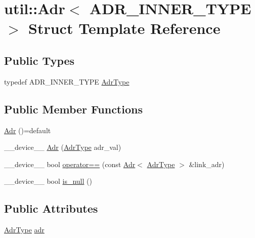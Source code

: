 \hypertarget{structutil_1_1Adr}{\section{util\-:\-:Adr$<$ A\-D\-R\-\_\-\-I\-N\-N\-E\-R\-\_\-\-T\-Y\-P\-E $>$ Struct Template Reference}
\label{structutil_1_1Adr}
}
\subsection*{Public Types}
\begin{DoxyCompactItemize}
\item 
typedef A\-D\-R\-\_\-\-I\-N\-N\-E\-R\-\_\-\-T\-Y\-P\-E \hyperlink{structutil_1_1Adr_a9e5161dc90263db4a33e195e310ccc45}{Adr\-Type}
\end{DoxyCompactItemize}
\subsection*{Public Member Functions}
\begin{DoxyCompactItemize}
\item 
\hyperlink{structutil_1_1Adr_a8b9054caa9404e1fcd00d06e0965aa49}{Adr} ()=default
\item 
\-\_\-\-\_\-device\-\_\-\-\_\- \hyperlink{structutil_1_1Adr_a788aac901f1054d2cd039c46596f2385}{Adr} (\hyperlink{structutil_1_1Adr_a9e5161dc90263db4a33e195e310ccc45}{Adr\-Type} adr\-\_\-val)
\item 
\-\_\-\-\_\-device\-\_\-\-\_\- bool \hyperlink{structutil_1_1Adr_aaffa3d3d87a91419d68be1cca6340a18}{operator==} (const \hyperlink{structutil_1_1Adr}{Adr}$<$ \hyperlink{structutil_1_1Adr_a9e5161dc90263db4a33e195e310ccc45}{Adr\-Type} $>$ \&link\-\_\-adr)
\item 
\-\_\-\-\_\-device\-\_\-\-\_\- bool \hyperlink{structutil_1_1Adr_aa2c2c8d809a9f7466bab53eff1fa815e}{is\-\_\-null} ()
\end{DoxyCompactItemize}
\subsection*{Public Attributes}
\begin{DoxyCompactItemize}
\item 
\hyperlink{structutil_1_1Adr_a9e5161dc90263db4a33e195e310ccc45}{Adr\-Type} \hyperlink{structutil_1_1Adr_a6cb4bfd249048c884be0aedd7f83c524}{adr}
\end{DoxyCompactItemize}
